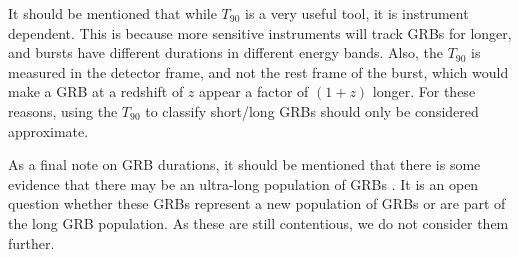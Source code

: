 \documentclass[11pt]{cuthesis}
\begin{document}

It should be mentioned that while $T_{90}$ is a very useful tool, it is instrument dependent. This is because more sensitive instruments will track GRBs for longer, and bursts have different durations in different energy bands. Also, the $T_{90}$ is measured in the detector frame, and not the rest frame of the burst, which would make a GRB at a redshift of $z$ appear a factor of $(1+z)$ longer. For these reasons, using the $T_{90}$ to classify short/long GRBs should only be considered approximate.  

As a final note on GRB durations, it should be mentioned that there is some evidence that there may be an ultra-long population of GRBs \cite{ul_grbs}. It is an open question whether these GRBs represent a new population of GRBs or are part of the long GRB population. As these are still contentious, we do not consider them further. 
\end{document}
